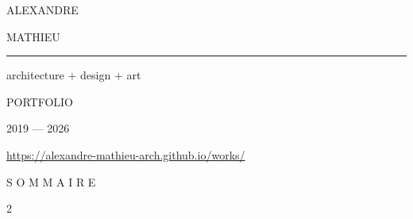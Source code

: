 \documentclass[10pt,a5paper,landscape]{article}
\begin{document}
{
\newpage
\thispagestyle{empty}
\begin{center}
    \vspace*{4.5cm}
    {\fontsize{18}{22} \lightfont {} ALEXANDRE} \par
    \vspace{0.2cm}
    {\fontsize{18}{22} \mediumfont {} MATHIEU} \par
    \vspace{0.8cm}
    {\color{bordergray} \rule{1.5cm}{0.2pt}} \par
    \vspace{0.8cm}
    {\fontsize{8}{10} \lightfont \color{mediumgray}  architecture + design + art} \par
    \vspace{4cm}
    {\fontsize{24}{28} \lightfont \color{darkgray}  PORTFOLIO} \par
    \vfill
    {\fontsize{7}{9} \lightfont \color{lightgray} 2019 --- 2026} \par
    \vspace{0.5cm}
    {\fontsize{7}{9} \lightfont \color{lightgray} \url{https://alexandre-mathieu-arch.github.io/works/}}
\end{center}
}

\newpage
\thispagestyle{empty}
\mbox{}

\newpage
\thispagestyle{plain}
\vspace*{1cm}
\begin{center}
    {\Huge \titlefont S O M M A I R E} \par
    \vspace{1cm}
\end{center}
\begin{multicols}{2}
    \makeatletter
    \makeatother
\end{multicols}

\end{document}

